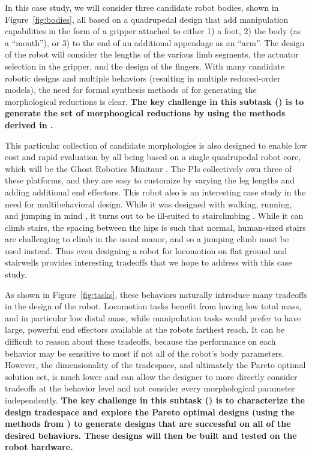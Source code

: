 \documentclass[11pt]{article}
\begin{document}
In this case study, we will consider three candidate robot bodies, shown in Figure~\ref{fig:bodies}, all based on a quadrupedal design that add manipulation capabilities in the form of a gripper attached to either 1) a foot, 2) the body (as a ``mouth''), or 3) to the end of an additional appendage as an ``arm''.  The design of the robot will consider the lengths of the various limb segments, the actuator selection in the gripper, and the design of the fingers.  With many candidate robotic designs and multiple behaviors (resulting in multiple reduced-order models), the need for formal synthesis methods of  for generating the morphological reductions is clear.  {\bf The key challenge in this subtask () is to generate the set of morphoogical reductions by using the methods derived in .}

This particular collection of candidate morphologies is also designed to enable low cost and rapid evaluation by all being based on a single quadrupedal robot core, which will be the Ghost Robotics Minitaur \cite{Kenneally2016-ml}. The PIs collectively own three of these platforms, and they are easy to customize by varying the leg lengths and adding additional end effectors. This robot also is an interesting case study in the need for multibehavioral design. While it was designed with walking, running, and jumping in mind \cite{Kenneally2015-yj,Kenneally2016-ml}, it turns out to be ill-suited to stairclimbing \cite{topping2017quasi,tr:ren2018riss}. While it can climb stairs, the spacing between the hips is such that normal, human-sized stairs are challenging to climb in the usual manor, and so a jumping climb must be used instead. Thus even designing a robot for locomotion on flat ground and stairwells provides interesting tradeoffs that we hope to address with this case study. 

As shown in Figure~\ref{fig:tasks}, these behaviors naturally introduce many tradeoffs in the design of the robot. Locomotion tasks benefit from having low total mass, and in particular low distal mass, while manipulation tasks would prefer to have large, powerful end effectors available at the robots farthest reach. It can be difficult to reason about these tradeoffs, because the performance on each behavior may be sensitive to most if not all of the robot's body parameters. However, the dimensionality of the tradespace, and ultimately the Pareto optimal solution set, is much lower and can allow the designer to more directly consider tradeoffs at the behavior level and not consider every morphological parameter independently. {\bf The key challenge in this subtask () is to characterize the design tradespace and explore the Pareto optimal designs (using the methods from ) to generate designs that are successful on all of the desired behaviors. These designs will then be built and tested on the robot hardware. }
\end{document}
